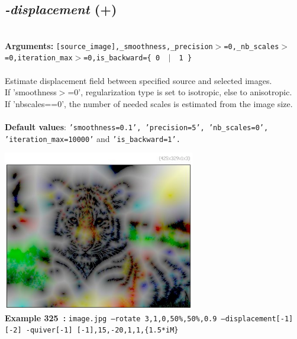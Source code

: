 \documentclass[a4paper,11pt,twoside]{book}
\begin{document}
\subsection{\emph{-displacement} (+)}\vspace*{-0.5em}
~\\\textbf{Arguments: } 
{\small \texttt{[source\_image],\_smoothness,\_precision$>$=0,\_nb\_scales$>$=0,iteration\_max$>$=0,is\_backward=\{ 0 ~$|$~ 1 \}}}\\~\\
Estimate displacement field between specified source and selected images.
~\\If 'smoothness$>$=0', regularization type is set to isotropic, else to anisotropic.
~\\If 'nbscales==0', the number of needed scales is estimated from the image size.
~\\~\\\textbf{Default values}: {\small \texttt{'smoothness=0.1', 'precision=5', 'nb\_scales=0', 'iteration\_max=10000'} and \texttt{'is\_backward=1'.}}
\begin{center}\includegraphics[keepaspectratio=true,height=7cm,width=\textwidth]{img/gmic_def325.jpg}\\
{\footnotesize \textbf{Example 325~:} \texttt{image.jpg --rotate 3,1,0,50\%,50\%,0.9 --displacement[-1] [-2] -quiver[-1] [-1],15,-20,1,1,\{1.5*iM\}}}
\end{center}
\end{document}
